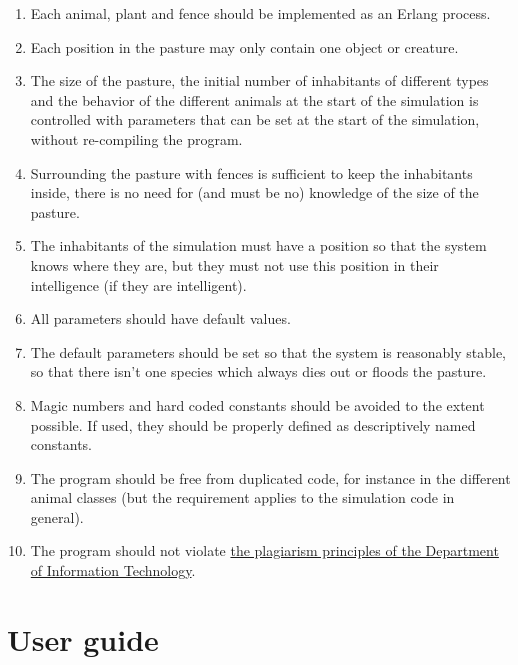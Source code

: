 \documentclass[12pt]{article}
\begin{document}
\begin{enumerate}
\item Each animal, plant and fence should be implemented as an Erlang process.

\item Each position in the pasture may only contain one object or creature.

\item The size of the pasture, the initial number of inhabitants of different types and the behavior of the different animals at the start of the simulation is controlled with parameters that can be set at the start of the simulation, without re-compiling the program.

\item Surrounding the pasture with fences is sufficient to keep the inhabitants inside, there is no need for (and must be no) knowledge of the size of the pasture.

\item The inhabitants of the simulation must have a position so that the system knows where they are, but they must not use this position in their intelligence (if they are intelligent).

\item All parameters should have default values.

\item The default parameters should be set so that the system is reasonably stable, so that there isn't one species which always dies out or floods the pasture.

\item Magic numbers and hard coded constants should be avoided to the extent possible. If used, they should be properly defined as descriptively named constants.

\item The program should be free from duplicated code, for instance in the different animal classes (but the requirement applies to the simulation code in general).

\item The program should not violate \href{http://www.it.uu.se/edu/fusk?lang=en}{the plagiarism principles of the Department of Information Technology}.
\end{enumerate}

\newpage

\section{User guide}
\end{document}
